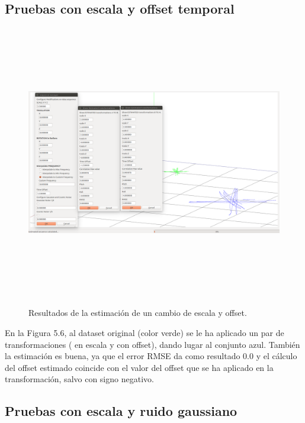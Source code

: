 \subsection{Pruebas con escala y offset temporal}
\begin{figure}[h]
\begin{center}
\label{fig:opciones de View}\includegraphics[height=12.0cm,width=18.0cm]{img/cap6/Escala_Offset_abba.png}
\hspace{0.5cm}

\end{center}

\caption{Resultados de la estimación de un cambio de escala y offset.}
\end{figure}

En la Figura 5.6, al dataset original (color verde) se le ha aplicado un par de transformaciones ( en escala y con offset), dando lugar al conjunto azul. También la estimación es buena, ya que el error RMSE da como resultado 0.0 y el cálculo del offset estimado coincide con el valor del offset que se ha aplicado en la transformación, salvo con signo negativo.

\subsection{Pruebas con escala y ruido gaussiano}

